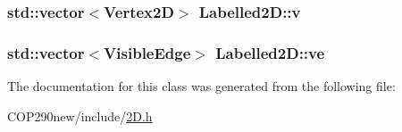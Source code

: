 \subsubsection[{\texorpdfstring{v}{v}}]{\setlength{\rightskip}{0pt plus 5cm}std\+::vector$<${\bf Vertex2D}$>$ Labelled2\+D\+::v}\hypertarget{class_labelled2_d_ab677e79d5e4bcfebbeb83dc38e5511e4}{}\label{class_labelled2_d_ab677e79d5e4bcfebbeb83dc38e5511e4}
\subsubsection[{\texorpdfstring{ve}{ve}}]{\setlength{\rightskip}{0pt plus 5cm}std\+::vector$<${\bf Visible\+Edge}$>$ Labelled2\+D\+::ve}\hypertarget{class_labelled2_d_ade711f960ea78222660c68b7ea29840b}{}\label{class_labelled2_d_ade711f960ea78222660c68b7ea29840b}


The documentation for this class was generated from the following file\+:\begin{DoxyCompactItemize}
\item 
C\+O\+P290new/include/\hyperlink{2_d_8h}{2\+D.\+h}\end{DoxyCompactItemize}
